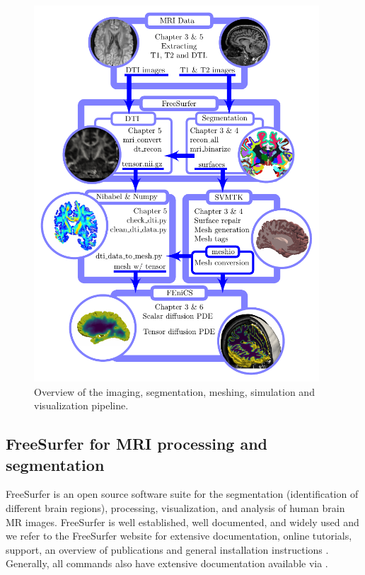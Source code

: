 \begin{figure}
\centering
 \includegraphics[width=0.95\textwidth]{./graphics/chp2/pipeline-overview.pdf} 
  \caption{Overview of the imaging, segmentation, meshing, simulation and visualization pipeline.}
  \label{fig:chp2:imaging-pipeine-overview}
\end{figure}

\subsection{FreeSurfer for MRI processing and segmentation}
\label{sec:chp2:tools:freesurfer}

FreeSurfer \cite{dale1999cortical} is an open source software suite
for the segmentation (identification of different brain regions), processing,
visualization, and analysis of human brain MR images. FreeSurfer is
well established, well documented, and widely used and we refer to the
FreeSurfer website for extensive documentation, online tutorials,
support, an overview of publications and general installation
instructions \cite{freesurfer}. Generally, all \freesurfer{} commands
also have extensive documentation available via . 

